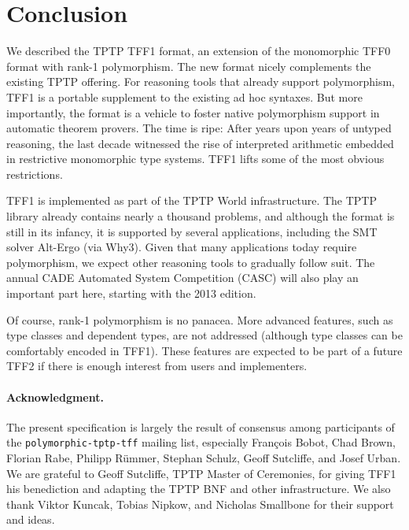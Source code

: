 \section{Conclusion}
\label{sec_concl}

We described the TPTP TFF1 format, an extension of the monomorphic TFF0 format
with rank-1 polymorphism. The new format nicely complements the existing TPTP
offering. %
For reasoning tools that already
support polymorphism, TFF1 is a portable supplement to the existing ad hoc
syntaxes. But more importantly, the format is a vehicle to foster native
polymorphism support in automatic theorem provers. The time is ripe: After years
upon years of untyped reasoning, the last decade witnessed the rise of
interpreted arithmetic embedded in restrictive monomorphic type systems. TFF1
lifts some of the most obvious restrictions.

TFF1 is implemented as part of the TPTP World infrastructure. The TPTP library
already contains nearly a thousand problems, and although the format is
still in its infancy, it is supported by several applications, including the SMT
solver Alt-Ergo (via Why3). Given that many applications today require
polymorphism, we expect other reasoning tools to gradually follow suit. The
annual CADE Automated System Competition (CASC) will also play an important
part here, starting with the 2013 edition.

Of course, rank-1 polymorphism is no panacea. More advanced features, such as
type classes and dependent types, are not addressed (although type
classes can be comfortably encoded in TFF1). These features are expected to be
part of a future TFF2 if there is enough interest from users and implementers.

\def\ackname{Acknowledgment}
\paragraph{\textbf{\upshape\ackname.}}
%
The present specification is largely the result of consensus among
participants of the {\tt polymorphic-tptp-tff} mailing list, especially
Fran\c{c}ois Bobot, Chad Brown, Florian Rabe, Philipp R\"ummer, Stephan Schulz,
Geoff Sutcliffe, and Josef Urban.
We are grateful to Geoff Sutcliffe, TPTP Master of Ceremonies, for giving TFF1
his benediction and adapting the TPTP BNF and other infrastructure.
We also thank Viktor Kuncak, Tobias Nipkow, and Nicholas Smallbone for their
support and ideas.
